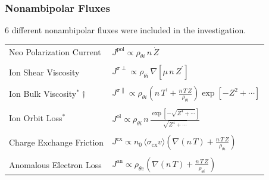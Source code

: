 \documentclass[10pt]{beamer}
\begin{document}
\begin{frame} %
\frametitle{Nonambipolar Fluxes}
6 different nonambipolar fluxes were included in the investigation.
\parencite{stringer_explanation_1993} \parencite{itoh_role_1996} \parencite{toda_theoretical_1997} \parencite{staps_backstepping_2017} \\
\begin{center}
\begin{tabular}{l|l} \hline
	Neo Polarization Current & $J^\text{pol} \propto \rho_{\theta i}\, n \, \dot{Z}$ \\ \\
	Ion Shear Viscosity & $J^{\pi\perp} \propto \rho_{\theta i} \,
		\nabla\left[\mu \, n \, Z^\prime\right]$ \\ \\
	Ion Bulk Viscosity$^\text{*}\dagger$ & $J^{\pi\parallel} \propto \rho_{\theta i}
		\left(n\,T^\prime + \frac{n\,T\,Z}{\rho_{\theta i}}\right)
		\exp\left[-Z^2 + \dotsb\right]$ \\ \\
	Ion Orbit Loss$^\text{*}$ & $J^\text{ol} \propto \rho_{\theta i} \, n \,
		\frac{\exp\left[-\sqrt{Z^4 + \dotsb}\right]}{\sqrt{Z^4 + \dotsb}}$ \\ \\
	Charge Exchange Friction & $J^\text{cx} \propto n_0 \,
		\langle \sigma_\text{cx} v\rangle \left(\nabla (n\,T) +
		\frac{n\,T\,Z}{\rho_{\theta i}}\right)$ \\ \\
	Anomalous Electron Loss & $J^\text{an} \propto \rho_{\theta e}
		\left(\nabla (n\,T) + \frac{n\,T\,Z}{\rho_{\theta i}}\right)$

\end{tabular}
\end{center}
\end{frame}
\end{document}
